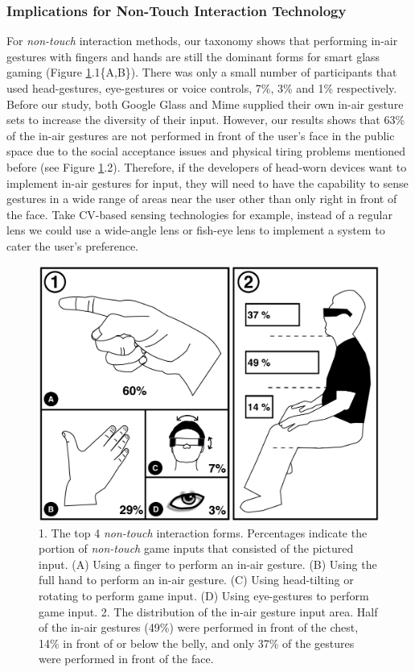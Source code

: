 \documentclass{sigchi}
\begin{document}
    \subsubsection{Implications for Non-Touch Interaction Technology}
    For \emph{non-touch} interaction methods, our taxonomy shows that performing in-air gestures with fingers and hands are still the dominant forms for smart glass gaming (Figure \ref{fig:figureInAirPorpotion}.1\{A,B\}). There was only a small number of participants that used head-gestures, eye-gestures or voice controls, 7\%, 3\% and 1\% respectively.
    Before our study, both Google Glass and Mime\cite{GoogleGlass, Colaco:2013:MCL:2501988.2502042} supplied their own in-air gesture sets to increase the diversity of their input. However, our results shows that 63\% of the in-air gestures are not performed in front of the user's face in the public space due to the social acceptance issues and physical tiring problems mentioned before (see Figure \ref{fig:figureInAirPorpotion}.2). Therefore, if the developers of head-worn devices want to implement in-air gestures for input, they will need to have the capability to sense gestures in a wide range of areas near the user other than only right in front of the face. Take CV-based sensing technologies for example, instead of a regular lens we could use a wide-angle lens or fish-eye lens to implement a system to cater the user's preference.   
  \begin{figure}[!h]
  \centering
  \includegraphics[width=1\columnwidth]{InAirControlArea.pdf}
  \caption{1. The top 4 \emph{non-touch} interaction forms. Percentages indicate the portion of \emph{non-touch} game inputs that consisted of the pictured input. (A) Using a finger to perform an in-air gesture. (B) Using the full hand to perform an in-air gesture. (C) Using head-tilting or rotating to perform game input. (D) Using eye-gestures to perform game input. 2. The distribution of the in-air gesture input area. Half of the in-air gestures (49\%) were performed in front of the chest, 14\% in front of or below the belly, and only 37\% of the gestures were performed in front of the face.}
  \label{fig:figureInAirPorpotion}
  \end{figure}
\end{document}

